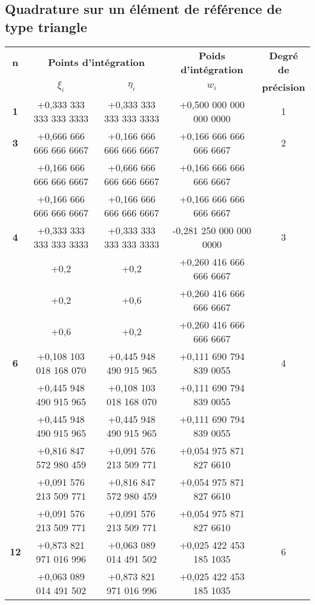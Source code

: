 \subsection{Quadrature sur un élément de référence de type triangle}
\begin{table}[H]
	\centering
	\footnotesize
	\begin{tabular}{|>{\bfseries}c|c|c|c|c|}
		\toprule
		\textbf{n} & \multicolumn{2}{c|}{\textbf{Points d'intégration}} & \textbf{Poids d'intégration} & \textbf{Degré de}\\
		& $\xi_i$ & $\eta_i$ & $w_i$ & \textbf{précision}\\
		\midrule
		1 & +0,333 333 333 333 3333 & +0,333 333 333 333 3333 & +0,500 000 000 000 0000 & 1\\
		\midrule
		3 & +0,666 666 666 666 6667 & +0,166 666 666 666 6667 & +0,166 666 666 666 6667 & 2\\
		 & +0,166 666 666 666 6667 & +0,666 666 666 666 6667 & +0,166 666 666 666 6667 & \\
		 & +0,166 666 666 666 6667 & +0,166 666 666 666 6667 & +0,166 666 666 666 6667 & \\
		\midrule
		4 & +0,333 333 333 333 3333 & +0,333 333 333 333 3333 & -0,281 250 000 000 0000 & 3\\
		  & +0,2 & +0,2 & +0,260 416 666 666 6667 & \\
          & +0,2 & +0,6 & +0,260 416 666 666 6667 & \\
          & +0,6 & +0,2 & +0,260 416 666 666 6667 & \\
        \midrule
        6 & +0,108 103 018 168 070 & +0,445 948 490 915 965 & +0,111 690 794 839 0055 & 4\\
          & +0,445 948 490 915 965 & +0,108 103 018 168 070 & +0,111 690 794 839 0055 & \\
          & +0,445 948 490 915 965 & +0,445 948 490 915 965 & +0,111 690 794 839 0055 & \\
          & +0,816 847 572 980 459 & +0,091 576 213 509 771 & +0,054 975 871 827 6610 & \\
          & +0,091 576 213 509 771 & +0,816 847 572 980 459 & +0,054 975 871 827 6610 & \\
          & +0,091 576 213 509 771 & +0,091 576 213 509 771 & +0,054 975 871 827 6610 & \\
        \midrule
        12 & +0,873 821 971 016 996 & +0,063 089 014 491 502 & +0,025 422 453 185 1035 & 6\\
           & +0,063 089 014 491 502 & +0,873 821 971 016 996 & +0,025 422 453 185 1035 & \\

\end{tabular}
\end{table}
